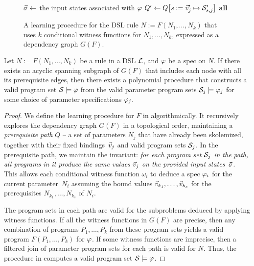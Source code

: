 \begin{figure}[p!]
\begin{fullpage}
\begin{algorithmic}[1]
            \Statex {}
            \Else
            \State $\vec{\sigma} \gets$ the input states associated with $\varphi$
             \label{alg:line:clusters}
            \State $Q' \gets Q\bigl[s := \vec{v}'_j \mapsto \mathcal{S}'_{s,j}\bigr]$
            \State \Yield \textbf{all} 
            \EndFor
            \EndIf
            \EndFunction
        \end{algorithmic}
        \caption{A learning procedure for the DSL rule $N := F(N_1, \dots, N_k)$ that uses $k$ conditional witness functions
        for $N_1, \dots, N_k$, expressed as a dependency graph $G(F)$.}
        \label{fig:prose:algorithm}
    \end{fullpage}
\end{figure}

\begin{theorem}
    Let $N := F(N_1, \dots, N_k)$ be a rule in a DSL $\mathcal{L}$, and $\varphi$ be a spec on $N$.
    If there exists an acyclic spanning subgraph of $G(F)$ that includes each node with all its prerequisite edges, then
    there exists a polynomial procedure that constructs a valid program set $\mathcal{S} \models \varphi$ from the valid
    parameter program sets $\mathcal{S}_j \models \varphi_j$ for some choice of parameter specifications $\varphi_j$.
    \label{thm:wf:cond}
\end{theorem}
\begin{proof}
    We define the learning procedure for $F$ in  algorithmically.
    It recursively explores the dependency graph $G(F)$ in a topological order, maintaining a \emph{prerequisite path}
    $Q$ -- a set of
    parameters $N_j$ that have already been skolemized, together with their fixed bindings~$\vec{v}_j$ and valid program
    sets $\mathcal{S}_j$.
    In the prerequisite path, we maintain the invariant: \emph{for each program set $\mathcal{S}_j$ in the path, all programs
        in it produce the same values $\vec{v}_j$ on the provided input states~$\vec{\sigma}$}.
    This allows each conditional witness function $\omega_{i}$ to deduce a spec $\varphi_i$ for the current
    parameter~$N_i$ assuming the bound values $\vec{v}_{k_1}, \dots, \vec{v}_{k_s}$ for the prerequisites
    $N_{k_1}, \dots, N_{k_s}$ of $N_i$.

    The program sets in each path are valid for the subproblems deduced by applying witness functions.
    If all the witness functions in $G(F)$ are precise, then any combination of programs $P_1, \dots, P_k$ from these
    program sets yields a valid program $F(P_1, \dots, P_k)$ for $\varphi$.
    If some witness functions are imprecise, then a filtered join of parameter program sets for each path is valid
    for $N$.
    Thus, the procedure in  computes a valid program set $\mathcal{S} \models \varphi$.
\end{proof}

